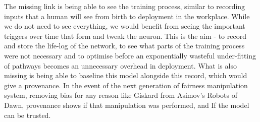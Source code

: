 The missing link is being able to see the training process, similar to recording inputs that a human will see from birth to deployment in the workplace. While we do not need to see everything, we would benefit from seeing the important triggers over time that form and tweak the neuron. This is the aim - to record and store the life-log of the network, to see what parts of the training process were not necessary and to optimise before an exponentially wasteful under-fitting of pathways becomes an unnecessary overhead in deployment. What is also missing is being able to baseline this model alongside this record, which would give a provenance. In the event of the next generation of fairness manipulation system, removing bias for any reason like Giskard from Asimov’s Robots of Dawn, provenance shows if that manipulation was performed, and If the model can be trusted.
